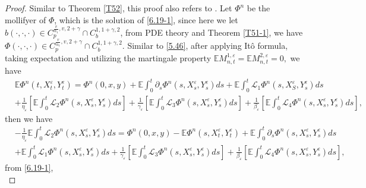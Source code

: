 \documentclass[11pt,reqno]{amsart}
\numberwithin{equation}{section}
\begin{document}
\begin{proof}
Similar to Theorem \ref{T52}, this proof also refers to \cite[Lemma 4.2]{RX}. Let $\Phi^{n}$ be the mollifyer of $\Phi$, which is the solution of \eqref{6.19-1}, since here we let $b(\cdot,\cdot,\cdot)\in C_{p}^{\frac{v}{\alpha_{1}},v,2+\gamma}\cap C_{b}^{1,1+\gamma,2}$, from PDE theory and Theorem \ref{T51-1}, we have $\Phi(\cdot,\cdot,\cdot)\in C_{p}^{\frac{v}{\alpha_{1}},v,2+\gamma}\cap C_{b}^{1,1+\gamma,2}$. Similar to \eqref{5.46}, after applying It\^{o} formula, taking expectation and utilizing the martingale property $\mathbb{E}M_{n,t}^{1,\varepsilon}=\mathbb{E}M_{n,t}^{2,\varepsilon}=0,$ we have
\begin{equation}\label{6.32}
	\begin{split}
		&\mathbb{E}\Phi^{n}(t,X_{t}^{\varepsilon},Y_{t}^{\varepsilon})=\Phi^{n}(0,x,y)+\mathbb{E}\int_{0}^{t}\partial_{s}\Phi^{n}(s,X_{s}^{\varepsilon},Y_{s}^{\varepsilon})ds+\mathbb{E}\int_{0}^{t} \mathcal{L}_{1}\Phi^{n}(s,X_{S}^{\varepsilon},Y_{s}^{\varepsilon})ds\\
	&+\frac{1}{\eta_{\varepsilon}}\left[ \mathbb{E}\int_{0}^{t}\mathcal{L}_{2}\Phi^{n}(s,X_{s}^{\varepsilon},Y_{s}^{\varepsilon})ds\right]+\frac{1}{\gamma_{\varepsilon}}\left[ \mathbb{E}\int_{0}^{t}\mathcal{L}_{3}\Phi^{n}(s,X_{s}^{\varepsilon},Y_{s}^{\varepsilon})ds\right]+\frac{1}{\beta_{\varepsilon}}\left[ \mathbb{E}\int_{0}^{t}\mathcal{L}_{4}\Phi^{n}(s,X_{s}^{\varepsilon},Y_{s}^{\varepsilon})ds\right],
	\end{split}
\end{equation}
then we have
\begin{equation}\label{6.33}
	\begin{split}
			&-\frac{1}{\eta_{\varepsilon}} \mathbb{E}\int_{0}^{t}\mathcal{L}_{2}\Phi^{n}(s,X_{s}^{\varepsilon},Y_{s}^{\varepsilon})ds	=\Phi^{n}(0,x,y)-\mathbb{E}\Phi^{n}(s,X_{t}^{\varepsilon},Y_{t}^{\varepsilon})+\mathbb{E}\int_{0}^{t}\partial_{s}\Phi^{n}(s,X_{s}^{\varepsilon},Y_{s}^{\varepsilon})ds\\
			&+\mathbb{E}\int_{0}^{t} \mathcal{L}_{1}\Phi^{n}(s,X_{s}^{\varepsilon},Y_{s}^{\varepsilon})ds+\frac{1}{\gamma_{\varepsilon}}\left[ \mathbb{E}\int_{0}^{t}\mathcal{L}_{3}\Phi^{n}(s,X_{s}^{\varepsilon},Y_{s}^{\varepsilon})ds\right]+\frac{1}{\beta_{\varepsilon}}\left[ \mathbb{E}\int_{0}^{t}\mathcal{L}_{4}\Phi^{n}(s,X_{s}^{\varepsilon},Y_{s}^{\varepsilon})ds\right],
	\end{split}
\end{equation}
from \eqref{6.19-1}, 
\begin{equation}\label{6.34}

\end{equation}
\end{proof}
\end{document}
